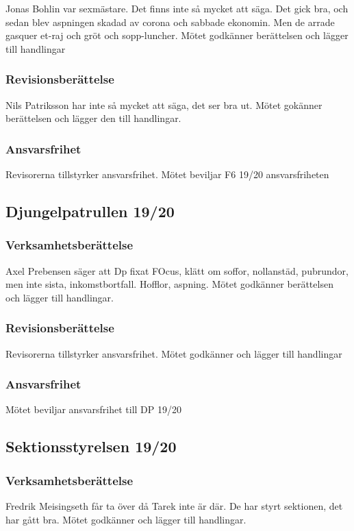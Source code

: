 \documentclass[hidelinks]{sektionsmote}
\begin{document}
Jonas Bohlin var sexmästare.
Det finns inte så mycket att säga. Det gick bra, och sedan blev aspningen skadad av corona och sabbade ekonomin.
Men de arrade gasquer et-raj och gröt och sopp-luncher.
Mötet godkänner berättelsen och lägger till handlingar

\subsubsection{Revisionsberättelse}
Nils Patriksson har inte så mycket att säga, det ser bra ut.
Mötet gokänner berättelsen och lägger den till handlingar.

\subsubsection{Ansvarsfrihet}
Revisorerna tillstyrker ansvarsfrihet.
Mötet beviljar F6 19/20 ansvarsfriheten

\subsection{Djungelpatrullen 19/20}

\subsubsection{Verksamhetsberättelse}
Axel Prebensen säger att Dp fixat FOcus, klätt om soffor, nollanstäd, pubrundor, men inte sista, inkomstbortfall.
Hofflor, aspning.
Mötet godkänner berättelsen och lägger till handlingar.

\subsubsection{Revisionsberättelse}
Revisorerna tillstyrker ansvarsfrihet.
Mötet godkänner och lägger till handlingar

\subsubsection{Ansvarsfrihet}
Mötet beviljar ansvarsfrihet till DP 19/20

\subsection{Sektionsstyrelsen 19/20}

\subsubsection{Verksamhetsberättelse}
Fredrik Meisingseth får ta över då Tarek inte är där.
De har styrt sektionen, det har gått bra.
Mötet godkänner och lägger till handlingar.
\end{document}

